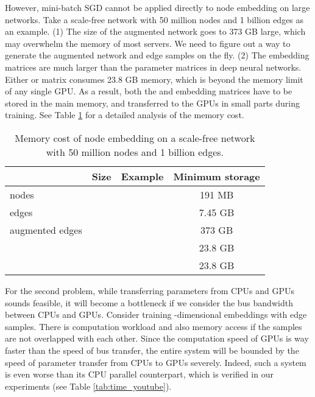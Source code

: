 \documentclass[sigconf]{acmart}
\begin{document}
However, mini-batch SGD cannot be applied directly to node embedding on large networks. Take a scale-free network with 50 million nodes and 1 billion edges as an example. (1) The size of the augmented network goes to 373 GB large, which may overwhelm the memory of most servers. We need to figure out a way to generate the augmented network and edge samples on the fly. (2) The embedding matrices are much larger than the parameter matrices in deep neural networks. Either  or  matrix consumes 23.8 GB memory, which is beyond the memory limit of any single GPU. As a result, both the  and  embedding matrices have to be stored in the main memory, and transferred to the GPUs in small parts during training. See Table \ref{tab:memory_cost} for a detailed analysis of the memory cost. 

\begin{table}[h]
    \centering
    \begin{adjustbox}{max width=0.48\textwidth}
        \begin{tabular}{lccc}
            \toprule
                                & Size              & Example               & Minimum storage   \\
            \midrule
            nodes               &              &               & 191 MB            \\
            edges               &              &               & 7.45 GB           \\
            augmented edges     &             &            & 373 GB            \\
                  &     &    & 23.8 GB           \\
                 &     &    & 23.8 GB           \\
            \bottomrule
        \end{tabular}
    \end{adjustbox}
    \caption{Memory cost of node embedding on a scale-free network with 50 million nodes and 1 billion edges.}
    \label{tab:memory_cost}
\end{table}

For the second problem, while transferring parameters from CPUs and GPUs sounds feasible, it will become a bottleneck if we consider the bus bandwidth between CPUs and GPUs. Consider training -dimensional embeddings with  edge samples. There is  computation workload and also  memory access if the samples are not overlapped with each other. Since the computation speed of GPUs is way faster than the speed of bus transfer, the entire system will be bounded by the speed of parameter transfer from CPUs to GPUs severely. Indeed, such a system is even worse than its CPU parallel counterpart, which is verified in our experiments (see Table \ref{tab:time_youtube}).
\end{document}
